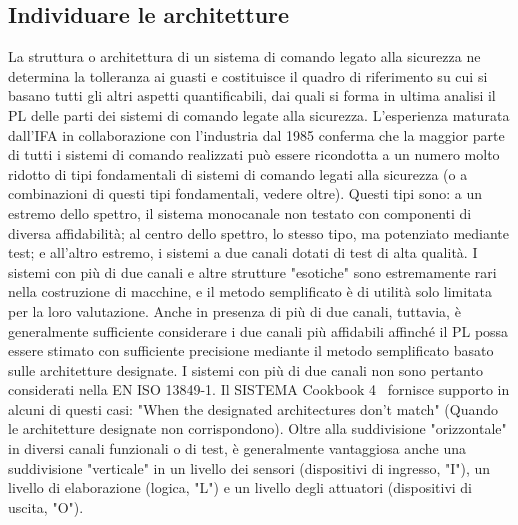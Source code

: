 \subsection{Individuare le architetture}
\label{subsec:06-2-1}
La struttura o architettura di un sistema di comando legato alla sicurezza ne determina la tolleranza ai guasti e costituisce il quadro di riferimento su cui si basano tutti gli altri aspetti quantificabili, dai quali si forma in ultima analisi il PL delle parti dei sistemi di comando legate alla sicurezza. L'esperienza maturata dall'IFA in collaborazione con l'industria dal 1985 conferma che la maggior parte di tutti i sistemi di comando realizzati può essere ricondotta a un numero molto ridotto di tipi fondamentali di sistemi di comando legati alla sicurezza (o a combinazioni di questi tipi fondamentali, vedere oltre). Questi tipi sono: a un estremo dello spettro, il sistema monocanale non testato con componenti di diversa affidabilità; al centro dello spettro, lo stesso tipo, ma potenziato mediante test; e all'altro estremo, i sistemi a due canali dotati di test di alta qualità. I sistemi con più di due canali e altre strutture "esotiche" sono estremamente rari nella costruzione di macchine, e il metodo semplificato è di utilità solo limitata per la loro valutazione. Anche in presenza di più di due canali, tuttavia, è generalmente sufficiente considerare i due canali più affidabili affinché il PL possa essere stimato con sufficiente precisione mediante il metodo semplificato basato sulle architetture designate. I sistemi con più di due canali non sono pertanto considerati nella EN ISO 13849-1. Il SISTEMA Cookbook 4~\cite{cookbook4} fornisce supporto in alcuni di questi casi: "When the designated architectures don't match" (Quando le architetture designate non corrispondono). Oltre alla suddivisione "orizzontale" in diversi canali funzionali o di test, è generalmente vantaggiosa anche una suddivisione "verticale" in un livello dei sensori (dispositivi di ingresso, "I"), un livello di elaborazione (logica, "L") e un livello degli attuatori (dispositivi di uscita, "O").

